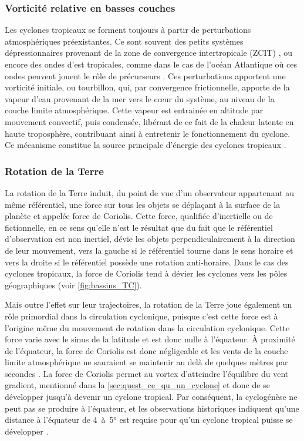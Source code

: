 \documentclass[../main.tex]{subfiles}
\begin{document}
\subsubsection{Vorticité relative en basses couches}

Les cyclones tropicaux se forment toujours à partir de perturbations atmosphériques préexistantes. Ce sont souvent des petits systèmes dépressionnaires provenant de la zone de convergence intertropicale (ZCIT) \parencite{gray_global_1968}, ou encore des ondes d'est tropicales, comme dans le cas de l'océan Atlantique où ces ondes peuvent jouent le rôle de précurseurs \parencite{thorncroft_african_2001,patricola_response_2018}. Ces perturbations apportent une
vorticité initiale, ou tourbillon, qui, par convergence frictionnelle, apporte de la vapeur d'eau provenant de la mer vers le cœur du système, au niveau de la couche limite atmosphérique. Cette vapeur est entrainée en altitude par mouvement convectif, puis condensée, libérant de ce fait de la chaleur latente en haute troposphère, contribuant ainsi à entretenir le fonctionnement du cyclone. Ce mécanisme constitue la source principale d'énergie des cyclones tropicaux \parencite{emanuel_dependence_1987}.

\subsubsection{Rotation de la Terre}

La rotation de la Terre induit, du point de vue d'un observateur appartenant au même référentiel, une force sur tous les objets se déplaçant à la surface de la planète et appelée force de Coriolis. Cette force, qualifiée d'inertielle ou de fictionnelle, en ce sens qu'elle n'est le résultat que du fait que le référentiel d'observation est non inertiel, dévie les objets perpendiculairement à la direction de leur mouvement, vers la gauche si le référentiel tourne dans le sens horaire et vers la droite si le référentiel possède une rotation anti-horaire. Dans le cas
des cyclones tropicaux, la force de Coriolis tend à dévier les cyclones vers les pôles géographiques (voir \cref{fig:bassins_TC}).

Mais outre l'effet sur leur trajectoires, la rotation de la Terre joue également un rôle primordial dans la circulation cyclonique, puisque c'est cette force est à l'origine même du mouvement de rotation dans la circulation cyclonique. Cette force varie avec le sinus de la latitude et est donc nulle à l'équateur. À proximité de l'équateur, la force de Coriolis est donc négligeable et les vents de la couche limite atmosphérique ne sauraient se maintenir au delà de quelques mètres par secondes
\parencite{gray_tropical_1975}. La force de Coriolis permet au vortex d'atteindre l'équilibre du vent gradient, mentionné dans la \cref{sec:quest_ce_qu_un_cyclone} et donc de se développer jusqu'à devenir un cyclone tropical. Par conséquent, la cyclogénèse ne peut pas se produire à l'équateur, et les observations historiques indiquent qu'une distance à l'équateur de \num{4}~à~\ang{5} est requise pour qu'un cyclone tropical puisse se développer \parencite{gray_global_1968}.
\end{document}
